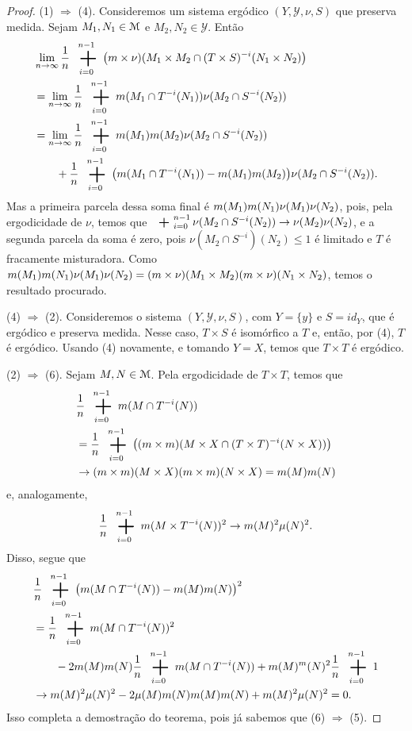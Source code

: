 \begin{proof}
(1) $\Rightarrow$ (4). Consideremos um sistema ergódico $(Y,\mathcal Y,\nu,S)$ que preserva medida. Sejam $M_1,N_1 \in \mathcal{M}$ e $M_2,N_2 \in \mathcal Y$. Então
	\begin{align*}
	&\lim_{n\to\infty} \frac{1}{n} \sum_{i=0}^{n-1} \big(\med\times\nu)(M_1 \times M_2 \cap (T \times S)^{-i}(N_1 \times N_2)\big) \\
	&=\lim_{n\to \infty} \frac{1}{n} \sum_{i=0}^{n-1} \med(M_1 \cap T^{-i}(N_1))\nu(M_2 \cap S^{-i}(N_2)) \\
	&= \lim_{n\to\infty} \frac{1}{n} \sum_{i=0}^{n-1} \med(M_1)\med(M_2)\nu(M_2 \cap S^{-i}(N_2)) \\
	&\qquad + \frac{1}{n} \sum_{i=0}^{n-1}\big(\med(M_1 \cap T^{-i}(N_1))- \med(M_1)\med(M_2)\big)\nu(M_2 \cap S^{-i}(N_2)).
	\end{align*}
Mas a primeira parcela dessa soma final é $m(M_1)m(N_1)\nu(M_1)\nu(N_2)$, pois, pela ergodicidade de $\nu$, temos que  $\sum_{i=0}^{n-1}\nu(M_2 \cap S^{-i}(N_2)) \conv \nu(M_2)\nu(N_2)$, e a segunda parcela da soma é zero, pois $\nu(M_2 \cap S^{-i})(N_2) \leq 1$ é limitado e $T$ é fracamente misturadora. Como $m(M_1)m(N_1)\nu(M_1)\nu(N_2)=(m\times\nu)(M_1\times M_2)(m\times\nu)(N_1\times N_2)$, temos o resultado procurado.

(4) $\Rightarrow$ (2). Consideremos o sistema $(Y,\mathcal Y,\nu,S)$, com $Y=\{y\}$  e $S=id_Y$, que é ergódico e preserva medida. Nesse caso, $T\times S$ é isomórfico a $T$ e, então, por (4), $T$ é ergódico. Usando (4) novamente, e tomando $Y=X$, temos que $T \times T$ é ergódico.

(2) $\Rightarrow$ (6). Sejam $M,N \in \mathcal{M}$. Pela ergodicidade de $T \times T$, temos que
	\begin{align*}
	&\frac{1}{n} \sum_{i=0}^{n-1} \med(M \cap T^{-i}(N))\\
	&=\frac{1}{n} \sum_{i=0}^{n-1} \big( (\med\times\med)(M \times X \cap (T \times T)^{-i}(N \times X))\big) \\
	& \conv (\med\times\med)(M\times X)(\med\times\med)(N\times X)=\med(M)\med(N)
	\end{align*}
e, analogamente,
	\begin{equation*}
	\frac{1}{n} \sum_{i=0}^{n-1} \med(M \times T^{-i}(N))^2 \conv \med(M)^2\mu(N)^2.
	\end{equation*}
Disso, segue que
	\begin{align*}
	&\frac{1}{n} \sum_{i=0}^{n-1} \big(\med(M \cap T^{-i}(N)) - \med(M)\med(N) \big)^2 \\
	&=\frac{1}{n} \sum_{i=0}^{n-1}\med(M \cap T^{-i}(N))^2 \\
		&\qquad - 2 \med(M)\med(N) \frac{1}{n} \sum_{i=0}^{n-1} \med(M \cap T^{-i}(N)) + \med(M)^\med(N)^2\frac{1}{n} \sum_{i=0}^{n-1} 1 \\
	&\conv \med(M)^2\mu(N)^2 - 2\mu(M)\med(N)\med(M)\med(N) + \med(M)^2\mu(N)^2 =0.
	\end{align*}
Isso completa a demostração do teorema, pois já sabemos que (6) $\Rightarrow$ (5).
\end{proof}

